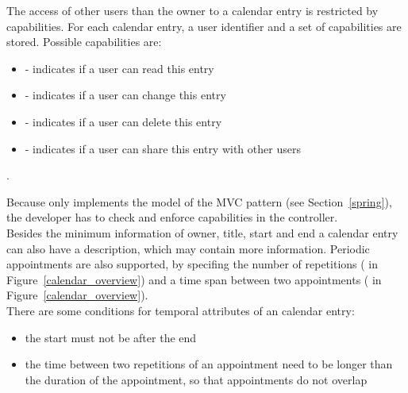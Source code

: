 The access of other users than the owner to a calendar entry is restricted by capabilities.
For each calendar entry, a user identifier and a set of capabilities are stored.
Possible capabilities are:
\begin{itemize}
    \item {} - indicates if a user can read this entry
    \item {} - indicates if a user can change this entry
    \item {} - indicates if a user can delete this entry
    \item {} - indicates if a user can share this entry with other users
\end{itemize}.

Because \salespoint{} only implements the model of the MVC pattern (see Section~\ref{spring}), the developer has to check and enforce capabilities in the controller.
\\

Besides the minimum information of owner, title, start and end a calendar entry can also have a description, which may contain more information.
Periodic appointments are also supported, by specifing the number of repetitions ( in Figure~\ref{calendar_overview}) and a time span between two appointments ( in Figure~\ref{calendar_overview}).
\\

There are some conditions for temporal attributes of an calendar entry:
\begin{itemize}
    \item the start must not be after the end
    \item the time between two repetitions of an appointment need to be longer than the duration of the appointment, so that appointments do not overlap
\end{itemize}
